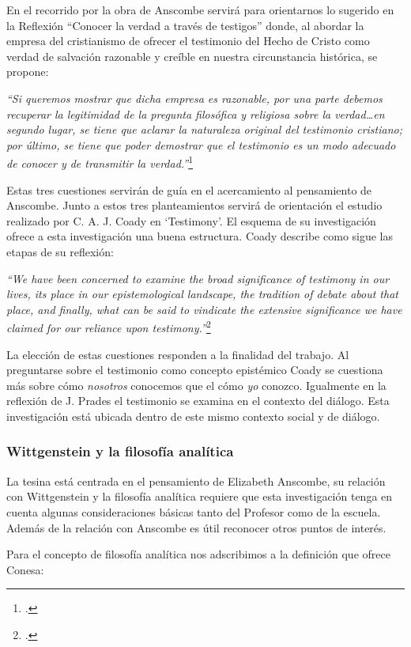 \documentclass[11pt]{article}
\begin{document}
En el recorrido por la obra de Anscombe servirá para orientarnos lo sugerido en la Reflexión ``Conocer la verdad a través de testigos'' donde, al abordar la empresa del cristianismo de ofrecer el testimonio del Hecho de Cristo como verdad de salvación razonable y creíble en nuestra circunstancia histórica, se propone:

\emph{
``Si queremos mostrar que dicha empresa es razonable, por una parte debemos recuperar la legitimidad de la pregunta filosófica y religiosa sobre la verdad\ldots en segundo lugar, se tiene que aclarar la naturaleza original del testimonio cristiano; por último, se tiene que poder demostrar que el testimonio es un modo adecuado de conocer y de transmitir la verdad.''}\footcite[267]{pradesmulticr}

Estas tres cuestiones servirán de guía en el acercamiento al pensamiento de Anscombe. Junto a estos tres planteamientos servirá de orientación el estudio realizado por C. A. J. Coady en `Testimony'. El esquema de su investigación ofrece a esta investigación una buena estructura. Coady describe como sigue las etapas de su reflexión:

\emph{``We have been concerned to examine the broad significance of testimony in our lives, its place in our epistemological landscape, the tradition of debate about that place, and finally, what can be said to vindicate the extensive significance we have claimed for our reliance upon testimony.''}\footcite[175]{testcoady}

La elección de estas cuestiones responden a la finalidad del trabajo. Al preguntarse sobre el testimonio como concepto epistémico Coady se cuestiona más sobre cómo \emph{nosotros} conocemos que el cómo \emph{yo} conozco. Igualmente en la reflexión de J. Prades el testimonio se examina en el contexto del diálogo. Esta investigación está ubicada dentro de este mismo contexto social y de diálogo.

\subsubsection{Wittgenstein y la filosofía analítica}

La tesina está centrada en el pensamiento de Elizabeth Anscombe, su relación con Wittgenstein y la filosofía analítica requiere que esta investigación tenga en cuenta algunas consideraciones básicas tanto del Profesor como de la escuela. Además de la relación con Anscombe es útil reconocer otros puntos de interés.

Para el concepto de filosofía analítica nos adscribimos a la definición que ofrece Conesa:
\end{document}
